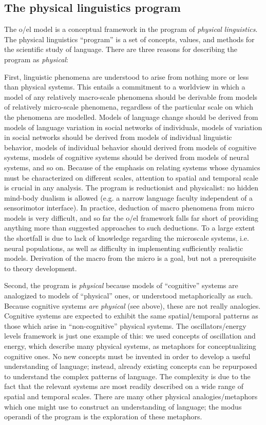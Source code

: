 \subsection{The physical linguistics program}

The o/el model is a conceptual framework in the program of \textit{physical} \textit{linguistics}. The physical linguistics “program” is a set of concepts, values, and methods for the scientific study of language. There are three reasons for describing the program as \textit{physical}: 

  First, linguistic phenomena are understood to arise from nothing more or less than physical systems. This entails a commitment to a worldview in which a model of any relatively macro-scale phenomena should be derivable from models of relatively micro-scale phenomena, regardless of the particular scale on which the phenomena are modelled. Models of language change should be derived from models of language variation in social networks of individuals, models of variation in social networks should be derived from models of individual linguistic behavior, models of individual behavior should derived from models of cognitive systems, models of cognitive systems should be derived from models of neural systems, and so on. Because of the emphasis on relating systems whose dynamics must be characterized on different scales, attention to spatial and temporal scale is crucial in any analysis. The program is reductionist and physicalist: no hidden mind-body dualism is allowed (e.g. a narrow language faculty independent of a sensorimotor interface). In practice, deduction of macro phenomena from micro models is very difficult, and so far the o/el framework falls far short of providing anything more than suggested approaches to such deductions. To a large extent the shortfall is due to lack of knowledge regarding the microscale systems, i.e. neural populations, as well as difficulty in implementing sufficiently realistic models. Derivation of the macro from the micro is a goal, but not a prerequisite to theory development.

  Second, the program is \textit{physical} because models of “cognitive” systems are analogized to models of “physical” ones, or understood metaphorically as such. Because cognitive systems \textit{are} \textit{physical} (see above), these are not really analogies. Cognitive systems are expected to exhibit the same spatial/temporal patterns as those which arise in “non-cognitive” physical systems. The oscillators/energy levels framework is just one example of this: we used concepts of oscillation and energy, which describe many physical systems, as metaphors for conceptualizing cognitive ones. No new concepts must be invented in order to develop a useful understanding of language; instead, already existing concepts can be repurposed to understand the complex patterns of language. The complexity is due to the fact that the relevant systems are most readily described on a wide range of spatial and temporal scales. There are many other physical analogies/metaphors which one might use to construct an understanding of language; the modus operandi of the program is the exploration of these metaphors.

